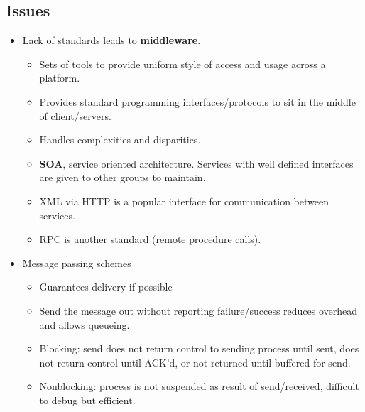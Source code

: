 \documentclass[fontsize=4.5pt]{scrartcl}
\begin{document}
\begin{multicols}{3}
     \subsection{Issues}
       \begin{itemize}
         \item Lack of standards leads to \textbf{middleware}.
         \begin{itemize}
           \item Sets of tools to provide uniform style of access and usage across a platform.
           \item Provides standard programming interfaces/protocols to sit in the middle of client/servers.
           \item Handles complexities and disparities.
           \item \textbf{SOA}, service oriented architecture. Services with well defined interfaces are given to other groups to maintain.
           \item XML via HTTP is a popular interface for communication between services.
           \item RPC is another standard (remote procedure calls).
         \end{itemize}
         \item Message passing schemes
         \begin{itemize}
           \item Guarantees delivery if possible
           \item Send the message out without reporting failure/success reduces overhead and allows queueing.
           \item Blocking: send does not return control to sending process until sent, does not return control until ACK'd, or not returned until buffered for send.
           \item Nonblocking: process is not suspended as result of send/received, difficult to debug but efficient.
         \end{itemize}
       \end{itemize}

\end{multicols}
\end{document}
